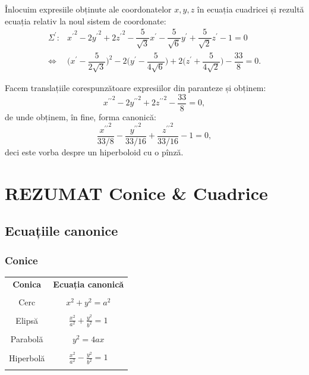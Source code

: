 \documentclass[11pt,a4paper]{article}
\theoremstyle{dotless}
\theoremstyle{dotlessdr}
\begin{document}
Înlocuim expresiile obținute ale coordonatelor $x, y, z$ în ecuația cuadricei
și rezultă ecuația relativ la noul sistem de coordonate:
\begin{align*}
	\Sigma^{\prime} :& {x^{\prime}}^2 - 2{y^{\prime}}^2 + 2{z^{\prime}}^2 -
	                    \dfrac{5}{\sqrt{3}} x^{\prime} - 
	                    \dfrac{5}{\sqrt{6}} y^{\prime} +
	                    \dfrac{5}{\sqrt{2}} z^{\prime} - 1 = 0 \\
\Longleftrightarrow & \Big( x^{\prime} - \dfrac{5}{2 \sqrt{3}} \Big)^2 -
                     2 \Big( y^{\prime} - \dfrac{5}{4 \sqrt{6}} \Big) + 
                     2 \Big( z^{\prime} + \dfrac{5}{4 \sqrt{2}} \Big) -
                     \dfrac{33}{8} = 0.
\end{align*}

Facem translațiile corespunzătoare expresiilor din paranteze și obținem: 
 \[
	{x^{\prime\prime}}^2 - 2 {y^{\prime\prime}}^2 + 2{z^{\prime\prime}}^2 - 
	\dfrac{33}{8} = 0,
\]
de unde obținem, în fine, forma canonică: 
 \[
	\dfrac{{x^{\prime\prime}}^2}{33/8} -
	\dfrac{{y^{\prime\prime}}^2}{33/16} +
	\dfrac{{z^{\prime\prime}}^2}{33/16} - 1 = 0,
\]
deci este vorba despre un hiperboloid cu o pînză.



\section{REZUMAT Conice \& Cuadrice}
\label{sec:rez-conice-c}

\subsection{Ecuațiile canonice}
\label{sec:ec-canonice}

\subsubsection{Conice}
\label{subsec:conice}

\begin{center}
  \begin{tabular}{| c | c |}
    \hline
    \textbf{Conica} & \textbf{Ecuația canonică} \\ & \\
    Cerc & $x^2 + y^2 = a^2$ \\ & \\
    Elipsă & $\frac{x^2}{a^2} + \frac{y^2}{b^2} = 1$ \\ & \\
    Parabolă & $y^2 = 4ax$ \\ & \\
    Hiperbolă & $\frac{x^2}{a^2} - \frac{y^2}{b^2} = 1$ \\ & \\
    \hline
  \end{tabular}
\end{center}
\end{document}
